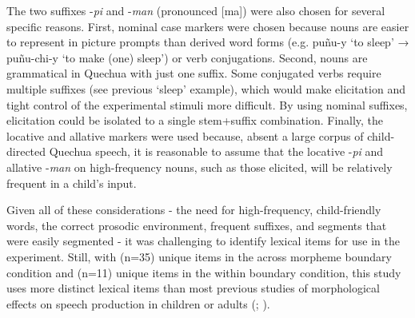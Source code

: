 \documentclass[a4paper,man,floatsintext,natbib,donotrepeattitle, apacite]{apa6}
\begin{document}
The two suffixes -\textit{pi} and -\textit{man} (pronounced [ma\ng]) were also chosen for several specific reasons. First, nominal case markers were chosen because nouns are easier to represent in picture prompts than derived word forms (e.g. pu{\~n}u-y `to sleep’ → pu{\~n}u-chi-y `to make (one) sleep’) or verb conjugations. Second, nouns are grammatical in Quechua with just one suffix. Some conjugated verbs require multiple suffixes (see previous `sleep’ example), which would make elicitation and tight control of the experimental stimuli more difficult. By using nominal suffixes, elicitation could be isolated to a single stem+suffix combination. Finally, the locative and allative markers were used because, absent a large corpus of child-directed Quechua speech, it is reasonable to assume that the locative -\textit{pi} and allative -\textit{man} on high-frequency nouns, such as those elicited, will be relatively frequent in a child’s input. 

Given all of these considerations - the need for high-frequency, child-friendly words, the correct prosodic environment, frequent suffixes, and segments that were easily segmented - it was challenging to identify lexical items for use in the experiment. Still, with (n=35) unique items in the across morpheme boundary condition and (n=11) unique items in the within boundary condition, this study uses more distinct lexical items than most previous studies of morphological effects on speech production in children or adults (\citealt{lee-kimMorphologicalEffectsDarkness2013}; \citealt{songEffectsCoarticulationMorphological2013}). 
\end{document}
